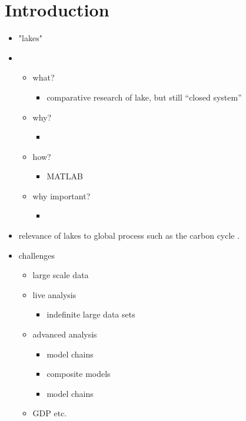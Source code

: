 
\chapter{Introduction}

\begin{itemize}
  \item "lakes"
  \item \la
  \begin{itemize}
    \item what?
    \begin{itemize}
      \item comparative research of lake, but still ``closed system''
    \end{itemize}
    \item why?
    \begin{itemize}
      \item
    \end{itemize}
    \item how?
    \begin{itemize}
      \item MATLAB
    \end{itemize}
    \item why important?
    \begin{itemize}
      \item
    \end{itemize}
  \end{itemize}
    \item relevance of lakes to global process such as the carbon cycle \citep{cole2007plumbing}.
  \item challenges
  \begin{itemize}
    \item large scale data
    \item live analysis
    \begin{itemize}
      \item indefinite large data sets
    \end{itemize}
    \item advanced analysis
    \begin{itemize}
      \item model chains
      \item composite models
      \item model chains
    \end{itemize}
    \item GDP etc.
    \begin{itemize}

\end{itemize}
\end{itemize}
\end{itemize}
